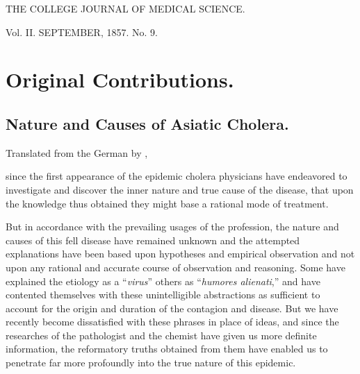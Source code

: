 THE
COLLEGE JOURNAL
OF MEDICAL SCIENCE.

Vol. II.
SEPTEMBER, 1857.
No. 9.

\chapter*{Original Contributions.}

\section*{Nature and Causes of Asiatic Cholera.}


\footnotesize
Translated from the German by , \md
\normalsize

 since the first appearance of the epidemic cholera physicians
have endeavored to investigate and discover the inner nature and true
cause of the disease, that upon the knowledge thus obtained they might
base a rational mode of treatment.

But in accordance with the prevailing usages of the profession, the
nature and causes of this fell disease have remained unknown and the
attempted explanations have been based upon hypotheses and empirical
observation and not upon any rational and accurate course of
observation and reasoning. Some have explained the etiology as
a ``\textit{virus}'' others as ``\textit{humores alienati},'' and have contented themselves
with these unintelligible abstractions as sufficient to account for
the origin and duration of the contagion and disease. But we have
recently become dissatisfied with these phrases in place of ideas, and
since the researches of the pathologist and the chemist have given us
more definite information, the reformatory truths obtained from them
have enabled us to penetrate far more profoundly into the true nature
of this epidemic.
\endinput
